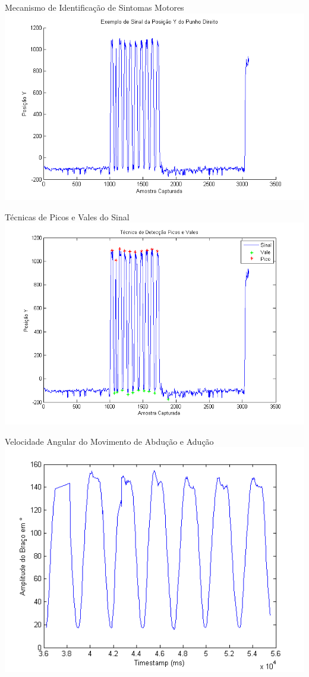 \documentclass{beamer}
\begin{document}
\begin{frame}{Mecanismo de Identificação de Sintomas Motores}
      \center \includegraphics[height=2.8 in]{img/exsinalposicaoypunhodireito.png}
\end{frame}



\begin{frame}{Técnicas de Picos e Vales do Sinal}
      \center 
      \includegraphics[height=2.8 in]{img/deteccaopicosvales.png}
\end{frame}



\begin{frame}{Velocidade Angular do Movimento de Abdução e Adução}
      \center 
      \includegraphics[height=2.8 in]{img/amplitude-braco.png}
\end{frame}
\end{document}
